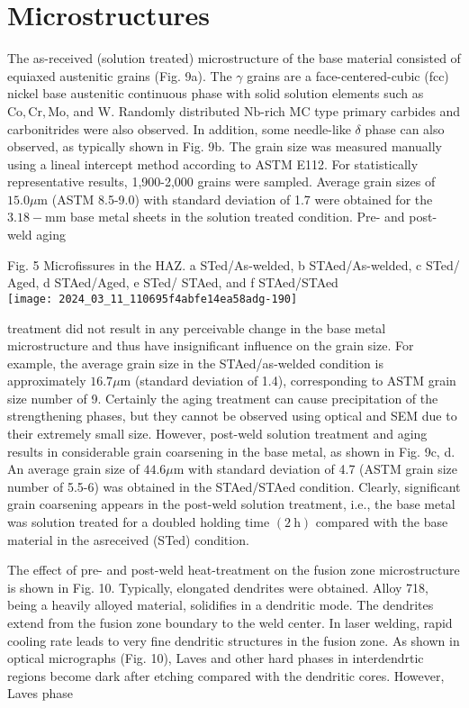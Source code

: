 \documentclass[10pt]{article}
\begin{document}
\section*{Microstructures}
The as-received (solution treated) microstructure of the base material consisted of equiaxed austenitic grains (Fig. 9a). The $\gamma$ grains are a face-centered-cubic (fcc) nickel base austenitic continuous phase with solid solution elements such as $\mathrm{Co}, \mathrm{Cr}, \mathrm{Mo}$, and W. Randomly distributed $\mathrm{Nb}$-rich $\mathrm{MC}$ type primary carbides and carbonitrides were also observed. In addition, some needle-like $\delta$ phase can also observed, as typically shown in Fig. 9b. The grain size was measured manually using a lineal intercept method according to ASTM E112. For statistically representative results, 1,900-2,000 grains were sampled. Average grain sizes of $15.0 \mu \mathrm{m}$ (ASTM 8.5-9.0) with standard deviation of 1.7 were obtained for the $3.18-\mathrm{mm}$ base metal sheets in the solution treated condition. Pre- and post-weld aging

Fig. 5 Microfissures in the HAZ. a STed/As-welded, b STAed/As-welded, c STed/ Aged, d STAed/Aged, e STed/ STAed, and f STAed/STAed\\
\texttt{[image: 2024\_03\_11\_110695f4abfe14ea58adg-190]}

treatment did not result in any perceivable change in the base metal microstructure and thus have insignificant influence on the grain size. For example, the average grain size in the STAed/as-welded condition is approximately $16.7 \mu \mathrm{m}$ (standard deviation of 1.4), corresponding to ASTM grain size number of 9. Certainly the aging treatment can cause precipitation of the strengthening phases, but they cannot be observed using optical and SEM due to their extremely small size. However, post-weld solution treatment and aging results in considerable grain coarsening in the base metal, as shown in Fig. 9c, d. An average grain size of $44.6 \mu \mathrm{m}$ with standard deviation of 4.7 (ASTM grain size number of 5.5-6) was obtained in the STAed/STAed condition. Clearly, significant grain coarsening appears in the post-weld solution treatment, i.e., the base metal was solution treated for a doubled holding time $(2 \mathrm{~h})$ compared with the base material in the asreceived (STed) condition.

The effect of pre- and post-weld heat-treatment on the fusion zone microstructure is shown in Fig. 10. Typically, elongated dendrites were obtained. Alloy 718, being a heavily alloyed material, solidifies in a dendritic mode. The dendrites extend from the fusion zone boundary to the weld center. In laser welding, rapid cooling rate leads to very fine dendritic structures in the fusion zone. As shown in optical micrographs (Fig. 10), Laves and other hard phases in interdendrtic regions become dark after etching compared with the dendritic cores. However, Laves phase
\end{document}
